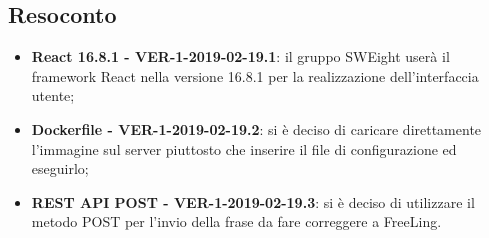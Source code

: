 \documentclass[a4paper, oneside, openany, dvipsnames, table]{article}
\begin{document}
\subsection{Resoconto}
\begin{itemize}
\item \textbf{React 16.8.1 - VER-1-2019-02-19.1}: il gruppo SWEight userà il framework React nella versione 16.8.1 per la realizzazione dell’interfaccia utente;
\item \textbf{Dockerfile - VER-1-2019-02-19.2}: si è deciso di caricare direttamente l'immagine sul server piuttosto che inserire il file di configurazione ed eseguirlo;
\item \textbf{REST API POST - VER-1-2019-02-19.3}: si è deciso di utilizzare il metodo POST per l'invio della frase da fare correggere a FreeLing.
\end{itemize}
\end{document}
